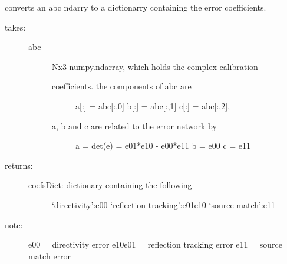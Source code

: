 \documentclass[letterpaper,10pt,english]{sphinxmanual}
\begin{document}
\begin{fulllineitems}
\label{api/mwavepy.calibration:mwavepy.calibration.calibrationAlgorithms.abc_2_coefs_dict}
converts an abc ndarry to a dictionarry containing the error 
coefficients.
\begin{description}
\item[{takes: }] \leavevmode\begin{description}
\item[{abc}] \leavevmode{[}Nx3 numpy.ndarray, which holds the complex calibration {]}\begin{description}
\item[{coefficients. the components of abc are }] \leavevmode
a{[}:{]} = abc{[}:,0{]}
b{[}:{]} = abc{[}:,1{]}
c{[}:{]} = abc{[}:,2{]},

\item[{a, b and c are related to the error network by }] \leavevmode
a = det(e) = e01*e10 - e00*e11 
b = e00 
c = e11

\end{description}

\end{description}

\item[{returns:}] \leavevmode\begin{description}
\item[{coefsDict: dictionary containing the following}] \leavevmode
`directivity':e00
`reflection tracking':e01e10
`source match':e11

\end{description}

\item[{note: }] \leavevmode
e00 = directivity error
e10e01 = reflection tracking error
e11 = source match error

\end{description}

\end{fulllineitems}


\begin{fulllineitems}
\label{api/mwavepy.calibration:mwavepy.calibration.calibrationAlgorithms.eight_term_2_one_port_coefs}
\end{fulllineitems}
\end{document}

